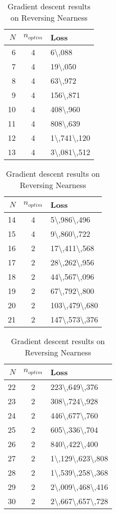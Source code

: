 \begingroup
\renewcommand{\arraystretch}{0.7}
\begin{table}[htpb]
\begin{center}
\begin{tabular}{r|c|l}
    $N$ & $n_{optim}$ & Loss\\\hline
6&4&\num{6\,088}\\
7&4&\num{19\,050}\\
8&4&\num{63\,972}\\
9&4&\num{156\,871}\\
10&4&\num{408\,960}\\
11&4&\num{808\,639}\\
12&4&\num{1\,741\,120}\\
13&4&\num{3\,081\,512}\\
\end{tabular}
\begin{tabular}{r|c|l}
    $N$ & $n_{optim}$ & Loss\\\hline
14&4&\num{5\,986\,496}\\
15&4&\num{9\,860\,722}\\
16&2&\num{17\,411\,568}\\
17&2&\num{28\,262\,956}\\
18&2&\num{44\,567\,096}\\
19&2&\num{67\,792\,800}\\
20&2&\num{103\,479\,680}\\
21&2&\num{147\,573\,376}\\
\end{tabular}
\begin{tabular}{r|c|l}
    $N$ & $n_{optim}$ & Loss\\\hline
22&2&\num{223\,649\,376}\\
23&2&\num{308\,724\,928}\\
24&2&\num{446\,677\,760}\\
25&2&\num{605\,336\,704}\\
26&2&\num{840\,422\,400}\\
27&2&\num{1\,129\,623\,808}\\
28&2&\num{1\,539\,258\,368}\\
29&2&\num{2\,009\,468\,416}\\
30&2&\num{2\,667\,657\,728}\\
\end{tabular}
\end{center}
\caption{Gradient descent results on Reversing Nearness}
    \label{tab:my_results}
\end{table}
\endgroup

